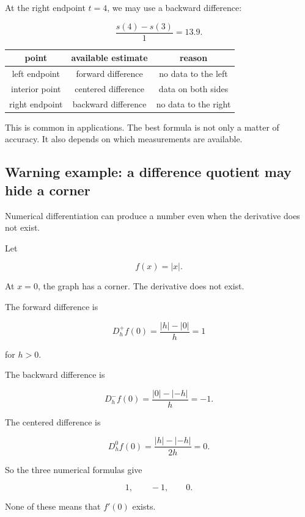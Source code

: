 At the right endpoint \(t=4\), we may use a backward difference:

\[
\frac{s(4)-s(3)}{1}
=
13.9.
\]

\begin{center}
\begin{tabular}{c|c|c}
\textbf{point} & \textbf{available estimate} & \textbf{reason} \\ \hline
left endpoint & forward difference & no data to the left \\
interior point & centered difference & data on both sides \\
right endpoint & backward difference & no data to the right
\end{tabular}
\end{center}

This is common in applications.  The best formula is not only a matter of accuracy.
It also depends on which measurements are available.

\subsection{Warning example: a difference quotient may hide a corner}
\label{subsec:difference-quotient-hide-corner}

Numerical differentiation can produce a number even when the derivative does not
exist.

Let

\[
f(x)=|x|.
\]

At \(x=0\), the graph has a corner.  The derivative does not exist.

The forward difference is

\[
D_h^+f(0)=\frac{|h|-|0|}{h}=1
\]

for \(h>0\).

The backward difference is

\[
D_h^-f(0)=\frac{|0|-|-h|}{h}=-1.
\]

The centered difference is

\[
D_h^0f(0)=\frac{|h|-|-h|}{2h}=0.
\]

So the three numerical formulas give

\[
1,\qquad -1,\qquad 0.
\]

None of these means that \(f'(0)\) exists.

